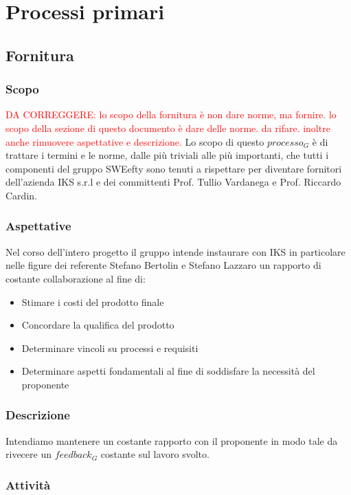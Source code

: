 \section{Processi primari}

\subsection{Fornitura}
	
	\subsubsection{Scopo}
		\textcolor{red}{DA CORREGGERE: lo scopo della fornitura è non dare norme, ma fornire. lo scopo della sezione di questo documento è dare delle norme. da rifare. inoltre anche rimuovere aspettative e descrizione.}
		Lo scopo di questo $processo_G$ è di trattare i termini e le norme, dalle più triviali alle più importanti, che tutti i componenti del gruppo SWEefty sono tenuti a rispettare per diventare fornitori dell'azienda IKS s.r.l e dei committenti Prof. Tullio Vardanega e Prof. Riccardo Cardin.
	\subsubsection{Aspettative}
	Nel corso dell'intero progetto il gruppo intende instaurare con IKS in particolare nelle figure dei referente Stefano Bertolin e Stefano Lazzaro un rapporto di costante collaborazione al fine di:
    \begin{itemize}
	\item Stimare i costi del prodotto finale
	\item Concordare la qualifica del prodotto 
	\item Determinare vincoli su processi e requisiti
	\item Determinare aspetti fondamentali al fine di soddisfare la necessità del proponente
	\end{itemize}
	\subsubsection{Descrizione}
	Intendiamo mantenere un costante rapporto con il proponente in modo tale da rivecere un $feedback_G$ costante sul lavoro svolto.
	\subsubsection{Attività} 
